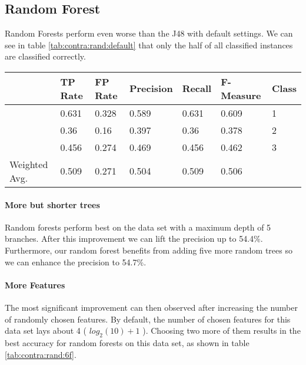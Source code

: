\documentclass[paper=a4, fontsize=11pt]{scrartcl} %
\numberwithin{equation}{section} %
\numberwithin{figure}{section} %
\numberwithin{table}{section} %
\begin{document}
\subsection{Random Forest}
Random Forests perform even worse than the J48 with default settings. We can see in table \ref{tab:contra:rand:default} that only the half of all classified instances are classified correctly.

\begin{table*}[htb]\centering
  \begin{tabular*}{\columnwidth}{@{}lllllll@{}}
      \toprule 
               &  TP Rate & FP Rate & Precision & Recall & F-Measure  & Class  \\  \midrule      
               &  0.631   & 0.328   & 0.589     & 0.631  & 0.609      & 1      \\       
               &  0.36    & 0.16    & 0.397     & 0.36   & 0.378      & 2      \\       
               &  0.456   & 0.274   & 0.469     & 0.456  & 0.462      & 3      \\       
Weighted Avg.  &  0.509   & 0.271   & 0.504     & 0.509  & 0.506      &        \\  \bottomrule     
    \end{tabular*}
\caption{Random Forests on Contraceptive Data Set -- Default Settings} 
\label{tab:contra:rand:default}
\end{table*}
\FloatBarrier

\paragraph{More but shorter trees}
Random forests perform best on the data set with a maximum depth of 5 branches. After this improvement we can lift the precision up to 54.4\%. Furthermore, our random forest benefits from adding five more random trees so we can enhance the precision to  54.7\%.
\paragraph{More Features}
The most significant improvement can then observed after increasing the number of randomly chosen features. By default, the number of chosen features for this data set lays about 4 ( $ log_2(10) + 1 $ ). Choosing two more of them results in the best accuracy for random forests on this data set, as shown in table \ref{tab:contra:rand:6f}.
\end{document}
